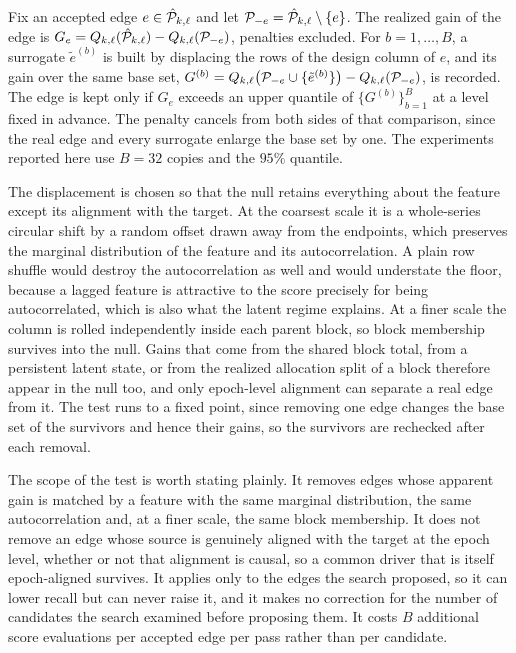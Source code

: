Fix an accepted edge $e \in \hat{{\mathcal{P}}}_{k,\ell}$ and let
${\mathcal{P}}_{-e} = \hat{{\mathcal{P}}}_{k,\ell} \setminus \{e\}$. The realized gain of the edge is
$G_e = Q_{k,\ell}(\hat{{\mathcal{P}}}_{k,\ell}) - Q_{k,\ell}({\mathcal{P}}_{-e})$, penalties excluded. For
$b = 1,\dots,B$, a surrogate $\tilde{e}^{(b)}$ is built by displacing the rows of the design
column of $e$, and its gain over the same base set,
$G^{(b)} = Q_{k,\ell}\big({\mathcal{P}}_{-e} \cup \{\tilde{e}^{(b)}\}\big) - Q_{k,\ell}({\mathcal{P}}_{-e})$, is
recorded. The edge is kept only if $G_e$ exceeds an upper quantile of $\{G^{(b)}\}_{b=1}^{B}$ at a
level fixed in advance. The penalty cancels from both sides of that comparison, since the real
edge and every surrogate enlarge the base set by one. The experiments reported here use $B = 32$
copies and the $95\%$ quantile.

The displacement is chosen so that the null retains everything about the feature except its
alignment with the target. At the coarsest scale it is a whole-series circular shift by a random
offset drawn away from the endpoints, which preserves the marginal distribution of the feature and
its autocorrelation. A plain row shuffle would destroy the autocorrelation as well and would
understate the floor, because a lagged feature is attractive to the score precisely for being
autocorrelated, which is also what the latent regime explains. At a finer scale the column is
rolled independently inside each parent block, so block membership survives into the null. Gains
that come from the shared block total, from a persistent latent state, or from the realized
allocation split of a block therefore appear in the null too, and only epoch-level alignment can
separate a real edge from it. The test runs to a fixed point, since removing one edge changes the
base set of the survivors and hence their gains, so the survivors are rechecked after each
removal.

The scope of the test is worth stating plainly. It removes edges whose apparent gain is matched by
a feature with the same marginal distribution, the same autocorrelation and, at a finer scale, the
same block membership. It does not remove an edge whose source is genuinely aligned with the
target at the epoch level, whether or not that alignment is causal, so a common driver that is
itself epoch-aligned survives. It applies only to the edges the search proposed, so it can lower
recall but can never raise it, and it makes no correction for the number of candidates the search
examined before proposing them. It costs $B$ additional score evaluations per accepted edge per
pass rather than per candidate.

